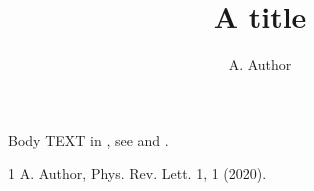 \documentclass[pra,twocolumn,a4paper,nopdfoutputerror]{quantumarticle}
\begin{document}
\title{A title}
\author{A. Author}
\maketitle
Body TEXT in \prl, see \textcite{a} and .
\begin{thebibliography}{1}
 A. Author, Phys. Rev. Lett. 1, 1 (2020).
\end{thebibliography}
\end{document}

